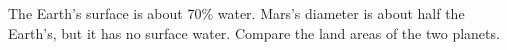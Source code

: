  The Earth's surface is about 70\% water. Mars's diameter
is about half the Earth's, but it has no surface water.
Compare the land areas of the two planets.\answercheck
